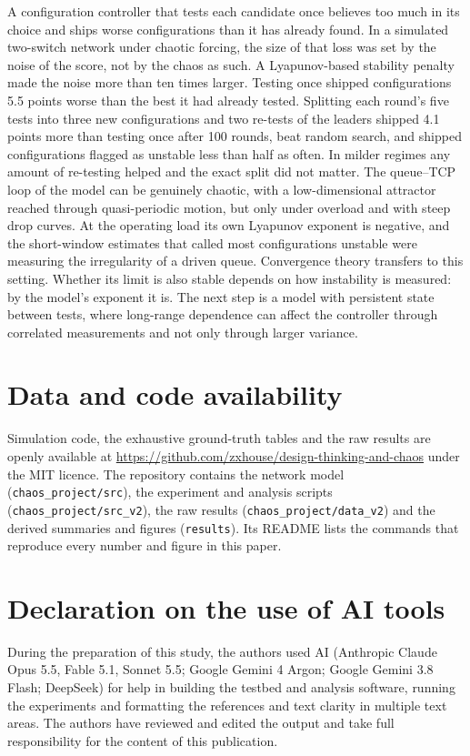 \documentclass[11pt,a4paper]{article}
\begin{document}
A configuration controller that tests each candidate once believes too much in its choice and ships worse configurations than it has already found. In a simulated two-switch network under chaotic forcing, the size of that loss was set by the noise of the score, not by the chaos as such. A Lyapunov-based stability penalty made the noise more than ten times larger. Testing once shipped configurations 5.5 points worse than the best it had already tested. Splitting each round's five tests into three new configurations and two re-tests of the leaders shipped 4.1 points more than testing once after 100 rounds, beat random search, and shipped configurations flagged as unstable less than half as often. In milder regimes any amount of re-testing helped and the exact split did not matter. The queue--TCP loop of the model can be genuinely chaotic, with a low-dimensional attractor reached through quasi-periodic motion, but only under overload and with steep drop curves. At the operating load its own Lyapunov exponent is negative, and the short-window estimates that called most configurations unstable were measuring the irregularity of a driven queue. Convergence theory transfers to this setting. Whether its limit is also stable depends on how instability is measured: by the model's exponent it is. The next step is a model with persistent state between tests, where long-range dependence can affect the controller through correlated measurements and not only through larger variance.

\section*{Data and code availability}
{\sloppy Simulation code, the exhaustive ground-truth tables and the raw results are openly available at \url{https://github.com/zxhouse/design-thinking-and-chaos} under the MIT licence. The repository contains the network model (\texttt{chaos\_project/src}), the experiment and analysis scripts (\texttt{chaos\_project/src\_v2}), the raw results (\texttt{chaos\_project/data\_v2}) and the derived summaries and figures (\texttt{results}). Its README lists the commands that reproduce every number and figure in this paper.\par}

\section*{Declaration on the use of AI tools}
During the preparation of this study, the authors used AI (Anthropic Claude Opus 5.5, Fable 5.1, Sonnet 5.5; Google Gemini 4 Argon; Google Gemini 3.8 Flash; DeepSeek) for help in building the testbed and analysis software, running the experiments and formatting the references and text clarity in multiple text areas. The authors have reviewed and edited the output and take full responsibility for the content of this publication.
\end{document}
